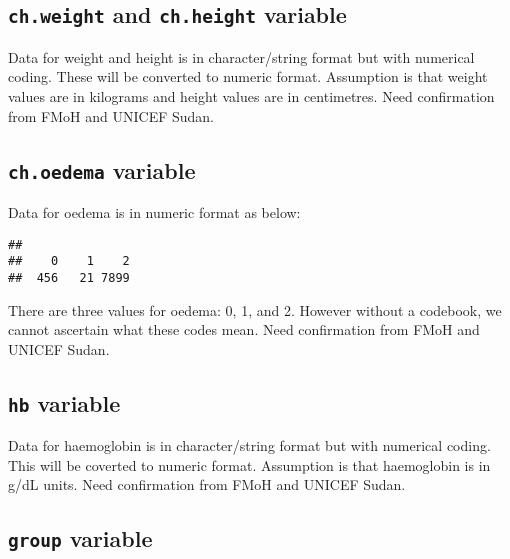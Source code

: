 \documentclass[12pt,a4paper]{article}
\newenvironment{Shaded}{\begin{snugshade}}{\end{snugshade}}
\newcommand{\KeywordTok}[1]{\textcolor[rgb]{0.13,0.29,0.53}{\textbf{#1}}}
\newcommand{\NormalTok}[1]{#1}
\newcommand{\OperatorTok}[1]{\textcolor[rgb]{0.81,0.36,0.00}{\textbf{#1}}}
\begin{document}
\hypertarget{ch.weight-and-ch.height-variable}{%
\subsection{\texorpdfstring{\texttt{ch.weight} and \texttt{ch.height} variable}{ch.weight and ch.height variable}}\label{ch.weight-and-ch.height-variable}}

Data for weight and height is in character/string format but with numerical coding. These will be converted to numeric format. Assumption is that weight values are in kilograms and height values are in centimetres. Need confirmation from FMoH and UNICEF Sudan.

\hypertarget{ch.oedema-variable}{%
\subsection{\texorpdfstring{\texttt{ch.oedema} variable}{ch.oedema variable}}\label{ch.oedema-variable}}

Data for oedema is in numeric format as below:

\begin{Shaded}
\end{Shaded}

\begin{verbatim}
## 
##    0    1    2 
##  456   21 7899
\end{verbatim}

There are three values for oedema: 0, 1, and 2. However without a codebook, we cannot ascertain what these codes mean. Need confirmation from FMoH and UNICEF Sudan.

\hypertarget{hb-variable}{%
\subsection{\texorpdfstring{\texttt{hb} variable}{hb variable}}\label{hb-variable}}

Data for haemoglobin is in character/string format but with numerical coding. This will be coverted to numeric format. Assumption is that haemoglobin is in g/dL units. Need confirmation from FMoH and UNICEF Sudan.

\hypertarget{group-variable}{%
\subsection{\texorpdfstring{\texttt{group} variable}{group variable}}\label{group-variable}}
\end{document}
